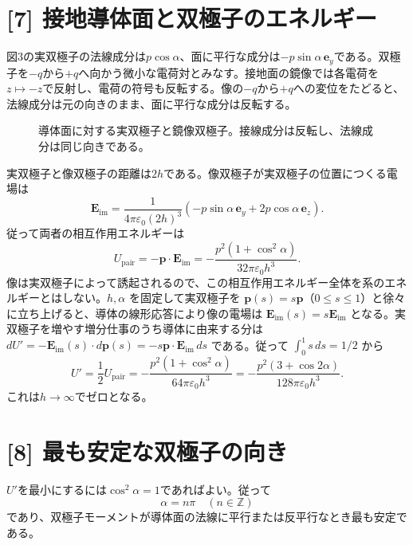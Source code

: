 \documentclass[11pt,a4paper]{article}
\begin{document}
\section*{[7] 接地導体面と双極子のエネルギー}
図3の実双極子の法線成分は$p\cos\alpha$、面に平行な成分は$-p\sin\alpha\,\boldsymbol e_y$である。双極子を$-q$から$+q$へ向かう微小な電荷対とみなす。接地面の鏡像では各電荷を$z\mapsto-z$で反射し、電荷の符号も反転する。像の$-q$から$+q$への変位をたどると、法線成分は元の向きのまま、面に平行な成分は反転する。
\begin{figure}[htbp]
\centering
{}
\caption{導体面に対する実双極子と鏡像双極子。接線成分は反転し、法線成分は同じ向きである。}
\end{figure}
実双極子と像双極子の距離は$2h$である。像双極子が実双極子の位置につくる電場は
\begin{equation}
  \boldsymbol E_{\mathrm{im}}=\frac{1}{4\pi\varepsilon_0(2h)^3}
  (-p\sin\alpha\,\boldsymbol e_y+2p\cos\alpha\,\boldsymbol e_z).
\end{equation}
従って両者の相互作用エネルギーは
\begin{equation}
  U_{\mathrm{pair}}=-\boldsymbol p\cdot\boldsymbol E_{\mathrm{im}}
  =-\frac{p^2(1+\cos^2\alpha)}{32\pi\varepsilon_0h^3}.
\end{equation}
像は実双極子によって誘起されるので、この相互作用エネルギー全体を系のエネルギーとはしない。$h,\alpha$ を固定して実双極子を $\boldsymbol p(s)=s\boldsymbol p$（$0\le s\le1$）と徐々に立ち上げると、導体の線形応答により像の電場は $\boldsymbol E_{\mathrm{im}}(s)=s\boldsymbol E_{\mathrm{im}}$ となる。実双極子を増やす増分仕事のうち導体に由来する分は $dU'=-\boldsymbol E_{\mathrm{im}}(s)\cdot d\boldsymbol p(s)=-s\boldsymbol p\cdot\boldsymbol E_{\mathrm{im}}\,ds$ である。従って $\int_0^1s\,ds=1/2$ から
\begin{equation}
  \boxed{U'=\frac12U_{\mathrm{pair}}
  =-\frac{p^2(1+\cos^2\alpha)}{64\pi\varepsilon_0h^3}
  =-\frac{p^2(3+\cos2\alpha)}{128\pi\varepsilon_0h^3}}.
\end{equation}
これは$h\to\infty$でゼロとなる。

\section*{[8] 最も安定な双極子の向き}
$U'$を最小にするには$\cos^2\alpha=1$であればよい。従って
\begin{equation}
  \boxed{\alpha=n\pi\quad(n\in\mathbb Z)}
\end{equation}
であり、双極子モーメントが導体面の法線に平行または反平行なとき最も安定である。
\end{document}
